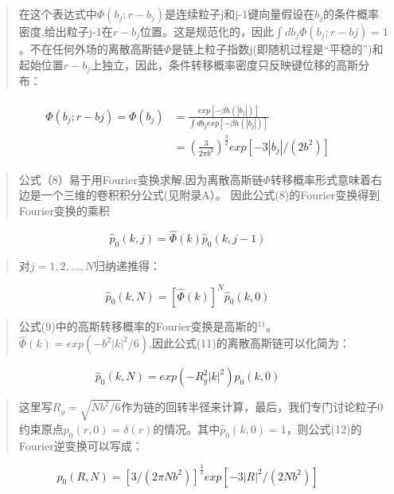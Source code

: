			\begin{quotation}
				在这个表达式中$\varPhi (b_{j};r-b_{j})$是连续粒子j和j-1键向量假设在$b_{j}$的条件概率密度,给出粒子j-1在$r-b_{j}$位置。这是规范化的，因此$\int db_{j} \varPhi (b_{j};r-b{j})=1$
				。不在任何外场的离散高斯链$\varPhi$是链上粒子指数j(即随机过程是“平稳的”)和起始位置$r-b_{j}$上独立，因此，条件转移概率密度只反映键位移的高斯分布：
			\end{quotation}
			\begin{equation}
			\begin{split}
			\begin{aligned}
			\varPhi(b_{j};r-b{j})=\varPhi(b_{j})&=\frac{exp[-\beta h(|b_{j}|)]}{\int db_{j}exp[-\beta h(|b_{j}|)]} \\
			&=(\frac{3}{2 \pi b^2})^{\frac{3}{2}}exp[-3|b_{j}| / (2b^2)]
			\end{aligned}
			\end{split}
			\end{equation}
			\begin{quotation}
				公式（8）易于用Fourier变换求解,因为离散高斯链$\varPhi$转移概率形式意味着右边是一个三维的卷积积分公式(见附录A）。 
				因此公式(8)的Fourier变换得到Fourier变换的乘积
			\end{quotation}
			\begin{equation}
			\hat{p}_{0}(k,j)=\hat{\varPhi}(k)\hat{p}_{0}(k,j-1)
			\end{equation}
			\begin{quotation}
				对$j=1,2,\dots ,N$归纳递推得：
			\end{quotation}
			\begin{equation}
			\hat{p}_{0}(k,N)=[\hat{\varPhi}(k)]^N\hat{p}_{0}(k,0)
			\end{equation}
			\begin{quotation}
				公式(9)中的高斯转移概率的Fourier变换是高斯的$^{11}$。$\hat{\varPhi}(k)=exp(-b^2|k|^2/6)$,因此公式(11)的离散高斯链可以化简为：
			\end{quotation}
			\begin{equation}
			\hat{p}_{0}(k,N)=exp(-R_{g}^2|k|^2)\hat{p}_{0}(k,0)
			\end{equation}
			\begin{quotation}
				这里写$R_{g}=\sqrt{Nb^2/6}$作为链的回转半径来计算，最后，我们专门讨论粒子0约束原点$p_{0}(r,0)=\delta(r)$的情况。其中$\hat{p}_{0}(k,0)=1$，则公式(12)的Fourier逆变换可以写成：
			\end{quotation}
			\begin{equation}
			p_{0}(R,N)=[3/(2\pi Nb^2)]^\frac{3}{2}exp[-3|R|^2/(2Nb^2)]
			\end{equation}
